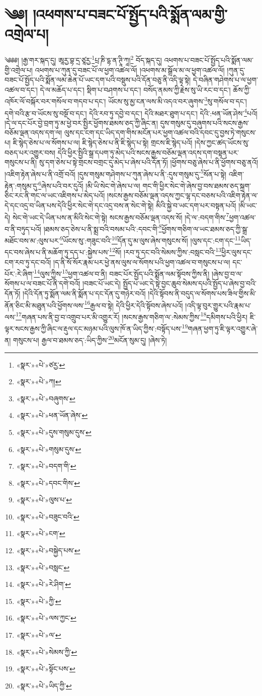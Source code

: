 \chapter{༄༅། །འཕགས་པ་བཟང་པོ་སྤྱོད་པའི་སྨོན་ལམ་གྱི་འགྲེལ་པ།}༄༅༅། །རྒྱ་གར་སྐད་དུ། ཨཱརྱ་བྷ་དྲ་ཙཱརྱ་\footnote{«སྣར་»«པེ་»ཙརྱ་}པྲ་ཎི་དྷ་ན་ཊཱི་ཀཱ།\footnote{«སྣར་»«པེ་»ཀ།} བོད་སྐད་དུ། འཕགས་པ་བཟང་པོ་སྤྱོད་པའི་སྨོན་ལམ་གྱི་འགྲེལ་པ། འཕགས་པ་ཀུན་དུ་བཟང་པོ་ལ་ཕྱག་འཚལ་ལོ། །འཕགས་མ་སྒྲོལ་མ་ལ་ཕྱག་འཚལ་ལོ། །ཀུན་དུ་བཟང་པོ་སྤྱོད་པའི་སྨོན་ལམ་ཆེན་པོ་ཡང་དག་པའི་བསྡུས་པའི་དོན་བཅུ་ནི་འདི་ལྟ་སྟེ། དེ་བཞིན་གཤེགས་པ་ལ་ཕྱག་འཚལ་བ་དང་། དེ་ལ་མཆོད་པ་དང་། སྡིག་པ་བཤགས་པ་དང་། བསོད་ནམས་ཀྱི་རྗེས་སུ་ཡི་རང་བ་དང་། ཆོས་ཀྱི་འཁོར་ལོ་བསྐོར་བར་གསོལ་བ་གདབ་པ་དང་། ཡོངས་སུ་མྱ་ངན་ལས་མི་འདའ་བར་ཞུགས་\footnote{«སྣར་»«པེ་»བཞུགས་}སུ་གསོལ་བ་དང་། དགེ་བའི་རྩ་བ་ཡོངས་སུ་བསྔོ་བ་དང་། དེའི་རབ་ཏུ་དབྱེ་བ་དང་། དེའི་མཐར་ཐུག་པ་དང་། དེའི་:ཕན་ཡོན་ཤེས་\footnote{«སྣར་»«པེ་»ཕན་ཡོན་ཞེས་}པའོ། །དེ་ལ་དང་པོར་བྱེ་བྲག་ཏུ་མ་ཕྱེ་བར་སྤྱིར་ཕྱོགས་ཐམས་ཅད་ཀྱི་ཞིང་ན། དུས་གསུམ་དུ་བཞུགས་པའི་སངས་རྒྱས་བཅོམ་ལྡན་འདས་དག་ལ། ལུས་དང་ངག་དང་ཡིད་དག་གིས་མངོན་པར་ཕྱག་འཚལ་བའི་དབང་དུ་བྱས་ཏེ་གསུངས་པ། ཇི་སྙེད་ཅེས་པ་ལ་སོགས་པ་ལ། ཇི་སྙེད་ཅེས་པ་ནི་ཇི་སྙེད་པ་སྟེ། གྲངས་ཇི་སྙེད་པའོ། །དེས་ཀྱང་ཚད་ཡོངས་སུ་བཅད་པར་འགྱུར་བས། དེའི་ཕྱིར་སྤྱིའི་སྒྲ་དཔག་ཏུ་མེད་པའི་སངས་རྒྱས་བཅོམ་ལྡན་འདས་དག་བསྟན་པར་གསུངས་པ་ནི། སུ་དག་ཅེས་པ་སྟེ་གྲངས་བགྲང་དུ་མེད་པ་ཞེས་པའི་དོན་ཏོ། །ཕྱོགས་བཅུ་ཞེས་པ་ནི་ཕྱོགས་བཅུ་ནའོ། །འཇིག་རྟེན་ཞེས་པ་ནི་འགྲོ་བའོ། །དུས་གསུམ་གཤེགས་པ་ཀུན་ཞེས་པ་ནི་:དུས་གསུམ་དུ་\footnote{«སྣར་»«པེ་»དུས་གསུམ་དུས་}སོན་པ་སྟེ། འཇིག་རྟེན་:གསུམ་དུ་\footnote{«སྣར་»«པེ་»གསུམ་དུས་}ཞེས་པའི་བར་དུའོ། །མི་ཡི་སེང་གེ་ཞེས་པ་ལ། གང་གི་ཕྱིར་སེང་གེ་ཞེས་བྱ་བས་ཐམས་ཅད་སྐྲག་ཅིང་རང་ནི་གང་ལ་ཡང་འཇིགས་པ་མེད་པའོ། །སངས་རྒྱས་བཅོམ་ལྡན་འདས་ཀྱང་ལྷ་དང་བཅས་པའི་འཇིག་རྟེན་ལ་དེ་དང་འདྲ་བ་ཡིན་པས་དེའི་ཕྱིར་སེང་གེ་དང་འདྲ་བས་ན་སེང་གེ་སྟེ། མིའི་སྐྱེ་བ་ཡང་དག་པར་བསྟན་པའོ། །མི་ཡང་དེ། སེང་གེ་ཡང་དེ་ཡིན་པས་ན་མིའི་སེང་གེ་སྟེ། སངས་རྒྱས་བཅོམ་ལྡན་འདས་སོ། །དེ་ལ་:བདག་གིས་\footnote{«སྣར་»«པེ་»བདག་གི་}ཕྱག་འཚལ་བ་ནི་བཏུད་པའོ། །ཐམས་ཅད་ཅེས་པ་ནི་སྨྲ་བའི་བསམ་པའི་:དབང་གི་\footnote{«སྣར་»«པེ་»དབང་གིས་}ཕྱོགས་གཅིག་ལ་ཡང་ཐམས་ཅད་ཀྱི་སྒྲ་མཐོང་བས་མ་:ལུས་པར་\footnote{«སྣར་»«པེ་»ལུས་པ་}ཡོངས་སུ་:གཟུང་བའི་\footnote{«སྣར་»«པེ་»བཟུང་བའི་}དོན་དུ་མ་ལུས་ཞེས་གསུངས་སོ། །ལུས་དང་:ངག་དང་\footnote{«སྣར་»«པེ་»ངག་}ཡིད་དང་བས་ཞེས་པ་ནི་མཆོག་ཏུ་དད་པ་:སྐྱེས་པས་\footnote{«སྣར་»«པེ་»བསྐྱེད་པས་}སོ། །རབ་ཏུ་དང་བའི་སེམས་ཀྱིས་:བསླང་བའི་\footnote{«སྣར་»«པེ་»བསླང་}ཕྱིར་ལུས་དང་ངག་རབ་ཏུ་དང་བའོ། །ད་ནི་སོ་སོར་རྣམ་པར་ཕྱེ་ནས་ལུས་ལ་སོགས་པའི་ཕྱག་འཚལ་བ་གསུངས་པ་ལ། དང་པོར་:རེ་ཞིག་\footnote{«སྣར་»«པེ་»རེ་ཤིག་}ལུས་ཀྱིས་\footnote{«སྣར་»«པེ་»ཀྱི་}ཕྱག་འཚལ་བ་ནི། བཟང་པོར་སྤྱོད་པའི་སྨོན་ལམ་སྟོབས་ཀྱིས་ནི། །ཞེས་བྱ་བ་ལ་སོགས་པ་ལ་བཟང་པོ་ནི་དགེ་བའོ། །བཟང་པོ་ཡང་དེ། སྤྱོད་པ་ཡང་དེ་སྟེ་བྱང་ཆུབ་སེམས་དཔའི་སྤྱོད་པ་ཞེས་བྱ་བའི་དོན་ཏོ། །དེའི་དོན་ཏུ་སྨོན་ལམ་ནི་སྨོན་པ་དང་དོན་དུ་གཉེར་བའོ། །དེའི་སྟོབས་ནི་བདུད་ལ་སོགས་པས་ཟིལ་གྱིས་མི་ནོན་ཅིང་མི་མཐུན་པའི་ཕྱོགས་ལས་\footnote{«སྣར་»«པེ་»ལས་ཀྱང་}རྒྱལ་བ་སྟེ། དེའི་ཕྱིར་དེའི་སྟོབས་ཞེས་པའོ། །འདི་ལྟ་བུར་གྱུར་པའི་རྣམ་པ་ལས་\footnote{«སྣར་»«པེ་»ལ་}གཞན་པས་ནི་བྱ་བ་འགྲུབ་པར་མི་འགྱུར་རོ། །སངས་རྒྱས་གཅིག་ལ་:སེམས་ཀྱིས་\footnote{«སྣར་»«པེ་»སེམས་ཀྱི་}དམིགས་པའི་ཕྱིར། ཇི་ལྟར་སངས་རྒྱས་ཀྱི་ཞིང་ལ་རྡུལ་དང་མཉམ་པའི་ལུས་ཁོ་ན་ཡིད་ཀྱིས་:བསྟོད་པས་\footnote{«སྣར་»«པེ་»སྟོང་པས་}གཞན་ཕྱག་ཏུ་ཇི་ལྟར་འགྱུར་ཞེ་ན། གསུངས་པ། རྒྱལ་བ་ཐམས་ཅད་:ཡིད་ཀྱིས་\footnote{«སྣར་»«པེ་»ཡིད་ཀྱི་}མངོན་སུམ་དུ། །ཞེས་ཏེ། 